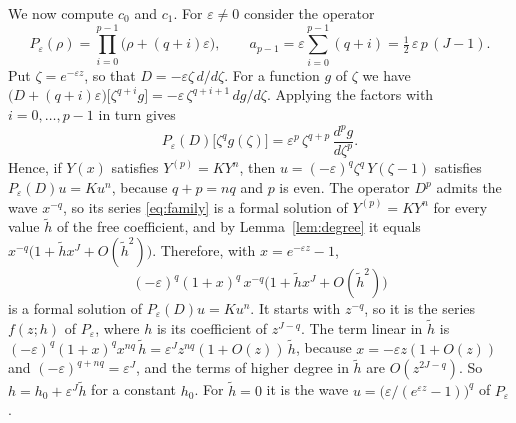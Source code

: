 \documentclass[11pt]{article}
\theoremstyle{definition}
\theoremstyle{remark}
\numberwithin{equation}{section}
\begin{document}
We now compute \(c_0\) and \(c_1\). For \(\varepsilon\ne0\) consider
the operator
\[
 P_\varepsilon(\rho)=\prod_{i=0}^{p-1}\bigl(\rho+(q+i)\varepsilon\bigr),
 \qquad a_{p-1}=\varepsilon\sum_{i=0}^{p-1}(q+i)
 =\tfrac12\,\varepsilon\,p\,(J-1).
\]
Put \(\zeta=e^{-\varepsilon z}\), so that
\(D=-\varepsilon\zeta\,d/d\zeta\). For a function \(g\) of \(\zeta\) we
have \(\bigl(D+(q+i)\varepsilon\bigr)\bigl[\zeta^{q+i}g\bigr]
=-\varepsilon\,\zeta^{q+i+1}\,dg/d\zeta\). Applying the factors with
\(i=0,\dots,p-1\) in turn gives
\[
 P_\varepsilon(D)\bigl[\zeta^{q}g(\zeta)\bigr]
 =\varepsilon^{p}\,\zeta^{q+p}\,\frac{d^{p}g}{d\zeta^{p}} .
\]
Hence, if \(Y(x)\) satisfies \(Y^{(p)}=KY^n\), then
\(u=(-\varepsilon)^q\zeta^q\,Y(\zeta-1)\) satisfies
\(P_\varepsilon(D)u=Ku^n\), because \(q+p=nq\) and \(p\) is even. The
operator \(D^p\) admits the wave \(x^{-q}\), so its series
\eqref{eq:family} is a formal solution of \(Y^{(p)}=KY^n\) for every
value \(\tilde h\) of the free coefficient, and by
Lemma~\ref{lem:degree} it equals
\(x^{-q}\bigl(1+\tilde hx^J+O(\tilde h^2)\bigr)\). Therefore, with
\(x=e^{-\varepsilon z}-1\),
\begin{equation}\label{eq:ap-family}
 (-\varepsilon)^q(1+x)^q\,x^{-q}\bigl(1+\tilde hx^J+O(\tilde h^2)\bigr)
\end{equation}
is a formal solution of \(P_\varepsilon(D)u=Ku^n\). It starts with
\(z^{-q}\), so it is the series \(f(z;h)\) of \(P_\varepsilon\), where
\(h\) is its coefficient of \(z^{J-q}\). The term linear in
\(\tilde h\) is
\((-\varepsilon)^q(1+x)^qx^{nq}\,\tilde h
=\varepsilon^Jz^{nq}(1+O(z))\,\tilde h\), because
\(x=-\varepsilon z(1+O(z))\) and \((-\varepsilon)^{q+nq}=\varepsilon^J\),
and the terms of higher degree in \(\tilde h\) are \(O(z^{2J-q})\). So
\(h=h_0+\varepsilon^J\tilde h\) for a constant \(h_0\). For \(\tilde h=0\) it is
the wave \(u=\bigl(\varepsilon/(e^{\varepsilon z}-1)\bigr)^q\) of
\(P_\varepsilon\).
\end{document}
